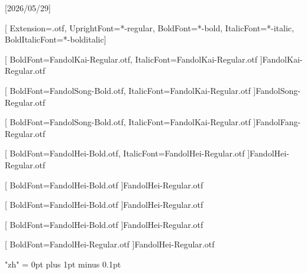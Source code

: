 
[2026/05/29]

\setsansfont{texgyreheros}[
Extension=.otf,
UprightFont=*-regular,
BoldFont=*-bold,
ItalicFont=*-italic,
BoldItalicFont=*-bolditalic]




[
	BoldFont=FandolKai-Regular.otf,
	ItalicFont=FandolKai-Regular.otf
]{FandolKai-Regular.otf}

[
	BoldFont=FandolSong-Bold.otf,
	ItalicFont=FandolKai-Regular.otf
]{FandolSong-Regular.otf}

[
	BoldFont=FandolSong-Bold.otf,
	ItalicFont=FandolKai-Regular.otf
]{FandolFang-Regular.otf}

[
	BoldFont=FandolHei-Bold.otf,
	ItalicFont=FandolHei-Regular.otf
]{FandolHei-Regular.otf}

[
	BoldFont=FandolHei-Bold.otf
]{FandolHei-Regular.otf}

[
	BoldFont=FandolHei-Bold.otf
]{FandolHei-Regular.otf}

[
	BoldFont=FandolHei-Bold.otf
]{FandolHei-Regular.otf}

[
	BoldFont=FandolHei-Regular.otf
]{FandolHei-Regular.otf}

\XeTeXlinebreaklocale "zh"
\XeTeXlinebreakskip = 0pt plus 1pt minus 0.1pt

\newcommand\kaishu{\CJKfamily{kai}}
\newcommand\songti{\CJKfamily{song}}
\newcommand\heiti{\CJKfamily{hei}}
\newcommand\thmheiti{\CJKfamily{hei2}}
\newcommand\fangsong{\CJKfamily{fangsong}}
\renewcommand{\em}{\bfseries\CJKfamily{emfont}}
